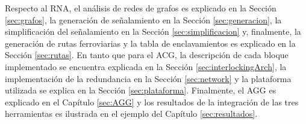     Respecto al RNA, el análisis de redes de grafos es explicado en la Sección \ref{sec:grafos}, la generación de señalamiento en la Sección \ref{sec:generacion}, la simplificación del señalamiento en la Sección \ref{sec:simplificacion} y, finalmente, la generación de rutas ferroviarias y la tabla de enclavamientos es explicado en la Sección \ref{sec:rutas}. En tanto que para el ACG, la descripción de cada bloque implementado se encuentra explicada en la Sección \ref{sec:interlockingArch}, la implementación de la redundancia en la Sección \ref{sec:network} y la plataforma utilizada se explica en la Sección \ref{sec:plataforma}. Finalmente, el AGG es explicado en el Capítulo \ref{sec:AGG} y los resultados de la integración de las tres herramientas es ilustrada en el ejemplo del Capítulo \ref{sec:resultados}.